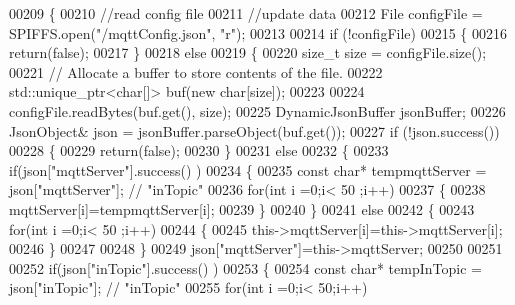 \begin{DoxyCode}
00209 \{
00210     \textcolor{comment}{//read config file}
00211     \textcolor{comment}{//update data}
00212     File configFile = SPIFFS.open(\textcolor{stringliteral}{"/mqttConfig.json"}, \textcolor{stringliteral}{"r"});
00213 
00214     \textcolor{keywordflow}{if} (!configFile) 
00215     \{
00216         \textcolor{keywordflow}{return}(\textcolor{keyword}{false});
00217     \}
00218     \textcolor{keywordflow}{else}
00219     \{
00220         \textcolor{keywordtype}{size\_t} size = configFile.size();
00221         \textcolor{comment}{// Allocate a buffer to store contents of the file.}
00222         std::unique\_ptr<char[]> buf(\textcolor{keyword}{new} \textcolor{keywordtype}{char}[size]);
00223 
00224         configFile.readBytes(buf.get(), size);
00225         DynamicJsonBuffer jsonBuffer;
00226         JsonObject& json = jsonBuffer.parseObject(buf.get());
00227         \textcolor{keywordflow}{if} (!json.success()) 
00228         \{
00229               \textcolor{keywordflow}{return}(\textcolor{keyword}{false});
00230         \} 
00231         \textcolor{keywordflow}{else}
00232         \{               
00233                 \textcolor{keywordflow}{if}(json[\textcolor{stringliteral}{"mqttServer"}].success() )
00234                 \{           
00235                     \textcolor{keyword}{const} \textcolor{keywordtype}{char}* tempmqttServer = json[\textcolor{stringliteral}{"mqttServer"}]; \textcolor{comment}{// "inTopic"}
00236                     \textcolor{keywordflow}{for}(\textcolor{keywordtype}{int} i =0;i< 50 ;i++)
00237                     \{
00238                         mqttServer[i]=tempmqttServer[i];
00239                     \}
00240                 \}
00241                 \textcolor{keywordflow}{else}
00242                 \{
00243                     \textcolor{keywordflow}{for}(\textcolor{keywordtype}{int} i =0;i< 50 ;i++)
00244                     \{
00245                         this->mqttServer[i]=this->mqttServer[i];
00246                     \}
00247 
00248                 \}
00249                 json[\textcolor{stringliteral}{"mqttServer"}]=this->mqttServer;
00250 
00251                 
00252                 \textcolor{keywordflow}{if}(json[\textcolor{stringliteral}{"inTopic"}].success() )
00253                 \{
00254                     \textcolor{keyword}{const} \textcolor{keywordtype}{char}* tempInTopic = json[\textcolor{stringliteral}{"inTopic"}]; \textcolor{comment}{// "inTopic"}
00255                     \textcolor{keywordflow}{for}(\textcolor{keywordtype}{int} i =0;i< 50;i++)

\end{DoxyCode}
